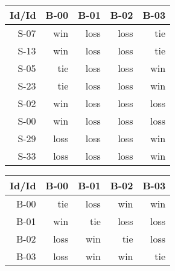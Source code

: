 \begin{tabular}{ | r | r | r | r | r | }
    \hline
        Id/Id  &   B-00  &   B-01  &   B-02  &   B-03  \\
    \hline
    \hline
         S-07  &    win  &   loss  &   loss  &    tie  \\
    \hline
         S-13  &    win  &   loss  &   loss  &    tie  \\
    \hline
         S-05  &    tie  &   loss  &   loss  &    win  \\
    \hline
         S-23  &    tie  &   loss  &   loss  &    win  \\
    \hline
         S-02  &    win  &   loss  &   loss  &   loss  \\
    \hline
         S-00  &    win  &   loss  &   loss  &   loss  \\
    \hline
         S-29  &   loss  &   loss  &   loss  &    win  \\
    \hline
         S-33  &   loss  &   loss  &   loss  &    win  \\
    \hline
\end{tabular}


\begin{tabular}{ | r | r | r | r | r | }
    \hline
        Id/Id  &   B-00  &   B-01  &   B-02  &   B-03  \\
    \hline
    \hline
         B-00  &    tie  &   loss  &    win  &    win  \\
    \hline
         B-01  &    win  &    tie  &   loss  &   loss  \\
    \hline
         B-02  &   loss  &    win  &    tie  &   loss  \\
    \hline
         B-03  &   loss  &    win  &    win  &    tie  \\
    \hline
\end{tabular}




